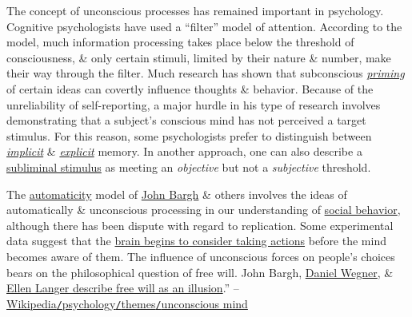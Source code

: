 \documentclass[oneside]{book}
\numberwithin{equation}{section}
\begin{document}
The concept of unconscious processes has remained important in psychology. Cognitive psychologists have used a ``filter'' model of attention. According to the model, much information processing takes place below the threshold of consciousness, \& only certain stimuli, limited by their nature \& number, make their way through the filter. Much research has shown that subconscious \href{https://en.wikipedia.org/wiki/Priming_(psychology)}{\textit{priming}} of certain ideas can covertly influence thoughts \& behavior. Because of the unreliability of self-reporting, a major hurdle in his type of research involves demonstrating that a subject's conscious mind has not perceived a target stimulus. For this reason, some psychologists prefer to distinguish between \href{https://en.wikipedia.org/wiki/Implicit_memory}{\textit{implicit}} \& \href{https://en.wikipedia.org/wiki/Explicit_memory}{\textit{explicit}} memory. In another approach, one can also describe a \href{https://en.wikipedia.org/wiki/Subliminal_stimulus}{subliminal stimulus} as meeting an \textit{objective} but not a \textit{subjective} threshold.

The \href{https://en.wikipedia.org/wiki/Automaticity}{automaticity} model of \href{https://en.wikipedia.org/wiki/John_Bargh}{John Bargh} \& others involves the ideas of automatically \& unconscious processing in our understanding of \href{https://en.wikipedia.org/wiki/Social_behavior}{social behavior}, although there has been dispute with regard to replication. Some experimental data suggest that the \href{https://en.wikipedia.org/wiki/Neuroscience_of_free_will}{brain begins to consider taking actions} before the mind becomes aware of them. The influence of unconscious forces on people's choices bears on the philosophical question of free will. John Bargh, \href{https://en.wikipedia.org/wiki/Daniel_Wegner}{Daniel Wegner}, \& \href{https://en.wikipedia.org/wiki/Illusion_of_control}{Ellen Langer describe free will as an illusion}.'' -- \href{https://en.wikipedia.org/wiki/Psychology#Unconscious_mind}{Wikipedia\texttt{/}psychology\texttt{/}themes\texttt{/}unconscious mind}
\end{document}
